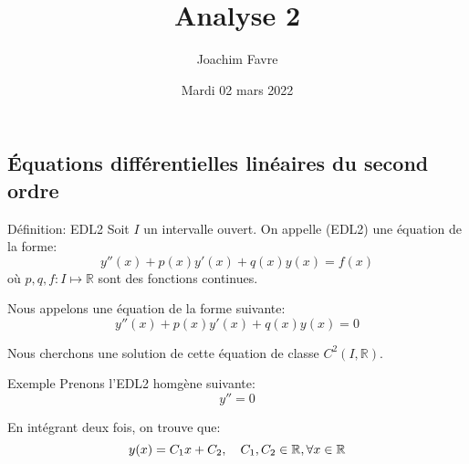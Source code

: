 \documentclass[a4paper]{article}
\title{Analyse 2}
\author{Joachim Favre}
\date{Mardi 02 mars 2022}
\begin{document}
\maketitle


\subsection[EDL2]{Équations différentielles linéaires du second ordre}
\begin{parag}{Définition: EDL2}
    Soit $I$ un intervalle ouvert. On appelle  (EDL2) une équation de la forme: 
    \[y''\left(x\right) + p\left(x\right)y'\left(x\right) + q\left(x\right)y\left(x\right) = f\left(x\right)\]
    où $p, q, f: I \mapsto \mathbb{R}$ sont des fonctions continues.
    
    Nous appelons  une équation de la forme suivante:
    \[y''\left(x\right) + p\left(x\right)y'\left(x\right) + q\left(x\right)y\left(x\right) = 0\]

    Nous cherchons une solution de cette équation de classe $C^2\left(I, \mathbb{R}\right)$.
\end{parag}

\begin{parag}{Exemple}
    Prenons l'EDL2 homgène suivante: 
    \[y'' = 0\]
    
    En intégrant deux fois, on trouve que: 
    \[y\left(x\right) = C_1 x + C_2, \mathspace C_1, C_2 \in \mathbb{R}, \forall x \in \mathbb{R}\]
\end{parag}
\end{document}
